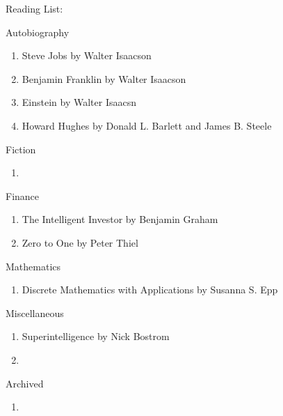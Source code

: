 \documentclass{article}
\begin{document}
\Huge Reading List: 

\hrulefill

\LARGE Autobiography

\normalsize 
    \begin{enumerate}
        \item Steve Jobs by Walter Isaacson
        \item Benjamin Franklin by Walter Isaacson
        \item Einstein by Walter Isaacsn 
        \item Howard Hughes by Donald L. Barlett and James B. Steele
    \end{enumerate}

\LARGE Fiction

\normalsize
    \begin{enumerate}
        \item 
    \end{enumerate}

\LARGE Finance

\normalsize
    \begin{enumerate}
        \item The Intelligent Investor by Benjamin Graham
        \item Zero to One by Peter Thiel
    \end{enumerate}



\LARGE Mathematics

\normalsize
    \begin{enumerate}
        \item Discrete Mathematics with Applications by Susanna S. Epp 
    \end{enumerate}

\LARGE Miscellaneous

\normalsize
    \begin{enumerate}
        \item Superintelligence by Nick Bostrom
        \item  
    \end{enumerate}
\hrulefill



\LARGE Archived

\normalsize
    \begin{enumerate}
        \item 
    \end{enumerate}

    
\end{document}
